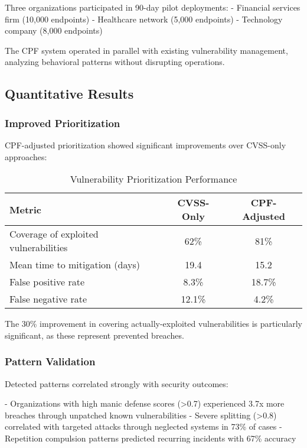 \documentclass[11pt,a4paper]{article}
\begin{document}
Three organizations participated in 90-day pilot deployments:
- Financial services firm (10,000 endpoints)
- Healthcare network (5,000 endpoints)
- Technology company (8,000 endpoints)

The CPF system operated in parallel with existing vulnerability management, analyzing behavioral patterns without disrupting operations.

\subsection{Quantitative Results}

\subsubsection{Improved Prioritization}

CPF-adjusted prioritization showed significant improvements over CVSS-only approaches:

\begin{table}[h!]
\centering
\caption{Vulnerability Prioritization Performance}
\label{tab:performance}
\begin{tabular}{lcc}
\toprule
Metric & CVSS-Only & CPF-Adjusted \\
\midrule
Coverage of exploited vulnerabilities & 62\% & 81\% \\
Mean time to mitigation (days) & 19.4 & 15.2 \\
False positive rate & 8.3\% & 18.7\% \\
False negative rate & 12.1\% & 4.2\% \\
\bottomrule
\end{tabular}
\end{table}

The 30\% improvement in covering actually-exploited vulnerabilities is particularly significant, as these represent prevented breaches.

\subsubsection{Pattern Validation}

Detected patterns correlated strongly with security outcomes:

- Organizations with high manic defense scores (>0.7) experienced 3.7x more breaches through unpatched known vulnerabilities
- Severe splitting (>0.8) correlated with targeted attacks through neglected systems in 73\% of cases
- Repetition compulsion patterns predicted recurring incidents with 67\% accuracy
\end{document}
